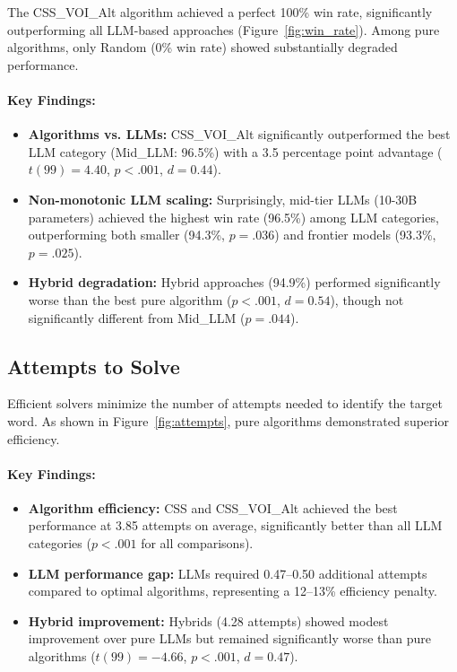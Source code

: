 The CSS\_VOI\_Alt algorithm achieved a perfect 100\% win rate, significantly outperforming all LLM-based approaches (Figure~\ref{fig:win_rate}). Among pure algorithms, only Random (0\% win rate) showed substantially degraded performance.

\paragraph{Key Findings:}
\begin{itemize}
    \item \textbf{Algorithms vs. LLMs:} CSS\_VOI\_Alt significantly outperformed the best LLM category (Mid\_LLM: 96.5\%) with a 3.5 percentage point advantage ($t(99) = 4.40$, $p < .001$, $d = 0.44$).
    \item \textbf{Non-monotonic LLM scaling:} Surprisingly, mid-tier LLMs (10-30B parameters) achieved the highest win rate (96.5\%) among LLM categories, outperforming both smaller (94.3\%, $p = .036$) and frontier models (93.3\%, $p = .025$).
    \item \textbf{Hybrid degradation:} Hybrid approaches (94.9\%) performed significantly worse than the best pure algorithm ($p < .001$, $d = 0.54$), though not significantly different from Mid\_LLM ($p = .044$).
\end{itemize}

\subsection{Attempts to Solve}

Efficient solvers minimize the number of attempts needed to identify the target word. As shown in Figure~\ref{fig:attempts}, pure algorithms demonstrated superior efficiency.

\paragraph{Key Findings:}
\begin{itemize}
    \item \textbf{Algorithm efficiency:} CSS and CSS\_VOI\_Alt achieved the best performance at 3.85 attempts on average, significantly better than all LLM categories ($p < .001$ for all comparisons).
    \item \textbf{LLM performance gap:} LLMs required 0.47--0.50 additional attempts compared to optimal algorithms, representing a 12--13\% efficiency penalty.
    \item \textbf{Hybrid improvement:} Hybrids (4.28 attempts) showed modest improvement over pure LLMs but remained significantly worse than pure algorithms ($t(99) = -4.66$, $p < .001$, $d = 0.47$).
\end{itemize}

